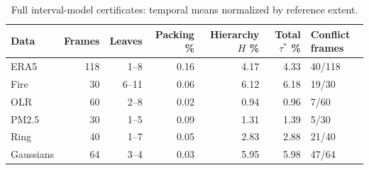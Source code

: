 \begin{table}[H]
\caption{Full interval-model certificates: temporal means normalized by reference extent.}\label{tab:cert}
\centering\footnotesize
\setlength{\tabcolsep}{3pt}
\begin{tabular}{lrrrrrl}\toprule
Data & Frames & Leaves & Packing \% & Hierarchy $H$ \% & Total $\tau^*$ \% & Conflict frames\\\midrule
ERA5 & 118 & 1--8 & 0.16 & 4.17 & 4.33 & 40/118\\
Fire & 30 & 6--11 & 0.06 & 6.12 & 6.18 & 19/30\\
OLR & 60 & 2--8 & 0.02 & 0.94 & 0.96 & 7/60\\
PM2.5 & 30 & 1--5 & 0.09 & 1.31 & 1.39 & 5/30\\
Ring & 40 & 1--7 & 0.05 & 2.83 & 2.88 & 21/40\\
Gaussians & 64 & 3--4 & 0.03 & 5.95 & 5.98 & 47/64\\
\bottomrule\end{tabular}
\par{}
\end{table}
